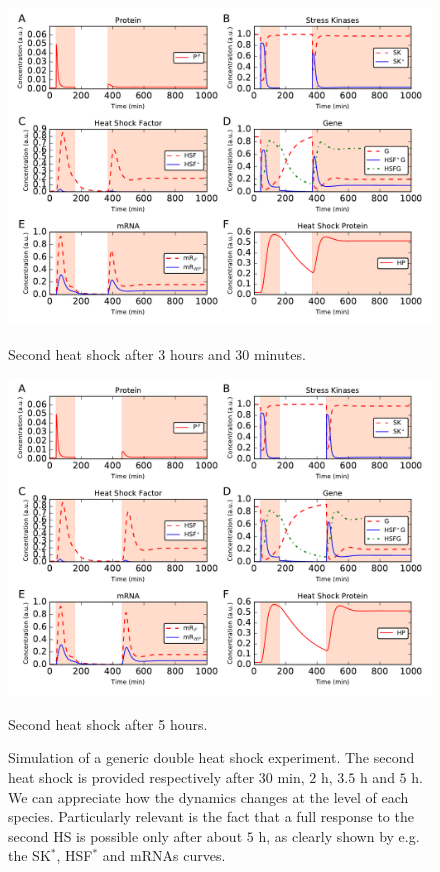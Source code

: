 \documentclass[oneside, 10pt, a4paper, twocolumn]{article}
\begin{document}
\begin{figure}
  \includegraphics[width=\textwidth, height=0.35\textheight]{HeatShockResponse_SimulationDoubleHeat3h30min.pdf}
  \caption*{\small{Second heat shock after 3 hours and 30 minutes.}}
\endminipage\hfill
{}
  \includegraphics[width=\textwidth, height=0.35\textheight]{HeatShockResponse_SimulationDoubleHeat5h.pdf}
  \caption*{\small{Second heat shock after 5 hours.}}
\endminipage\hfill
\caption{\small{Simulation of a generic double heat shock experiment. The second heat shock is provided respectively after $30$ min, $2$ h, $3.5$ h and $5$ h. We can appreciate how the dynamics changes at the level of each species. Particularly relevant is the fact that a full response to the second HS is possible only after about $5$ h, as clearly shown by e.g. the SK$^*$, HSF$^*$ and mRNAs curves.}}
  \label{FigDoubleHS}
\end{figure}
\end{document}
